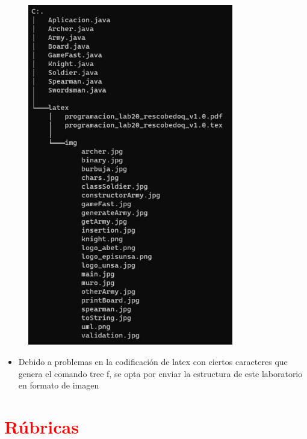 \documentclass{article}
\begin{document}
	\begin{figure}[H]
		\centering
		\includegraphics[width=0.8\textwidth,keepaspectratio]{img/tree.jpg}
	\end{figure}	
	
	\begin{itemize}	
		\item Debido a problemas en la codificación de latex con ciertos caracteres que genera el comando tree f, se opta 
		por enviar la estructura de este laboratorio en formato de imagen
	\end{itemize}
	

   
	
	\section{\textcolor{red}{Rúbricas}}
	
\end{document}
